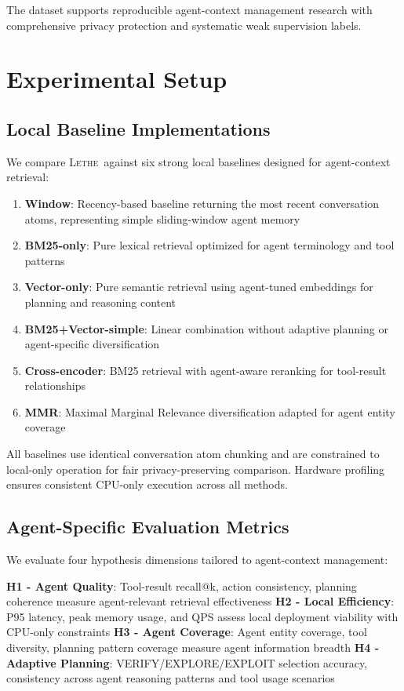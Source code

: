 \documentclass[letterpaper]{article}
\newcommand{\lethe}{\textsc{Lethe}}
\begin{document}
The dataset supports reproducible agent-context management research with comprehensive privacy protection and systematic weak supervision labels.

\section{Experimental Setup}

\subsection{Local Baseline Implementations}

We compare \lethe\ against six strong local baselines designed for agent-context retrieval:

\begin{enumerate}
    \item \textbf{Window}: Recency-based baseline returning the most recent conversation atoms, representing simple sliding-window agent memory
    \item \textbf{BM25-only}: Pure lexical retrieval optimized for agent terminology and tool patterns
    \item \textbf{Vector-only}: Pure semantic retrieval using agent-tuned embeddings for planning and reasoning content
    \item \textbf{BM25+Vector-simple}: Linear combination without adaptive planning or agent-specific diversification
    \item \textbf{Cross-encoder}: BM25 retrieval with agent-aware reranking for tool-result relationships
    \item \textbf{MMR}: Maximal Marginal Relevance diversification adapted for agent entity coverage
\end{enumerate}

All baselines use identical conversation atom chunking and are constrained to local-only operation for fair privacy-preserving comparison. Hardware profiling ensures consistent CPU-only execution across all methods.

\subsection{Agent-Specific Evaluation Metrics}

We evaluate four hypothesis dimensions tailored to agent-context management:

\textbf{H1 - Agent Quality}: Tool-result recall@k, action consistency, planning coherence measure agent-relevant retrieval effectiveness
\textbf{H2 - Local Efficiency}: P95 latency, peak memory usage, and QPS assess local deployment viability with CPU-only constraints
\textbf{H3 - Agent Coverage}: Agent entity coverage, tool diversity, planning pattern coverage measure agent information breadth
\textbf{H4 - Adaptive Planning}: VERIFY/EXPLORE/EXPLOIT selection accuracy, consistency across agent reasoning patterns and tool usage scenarios
\end{document}
